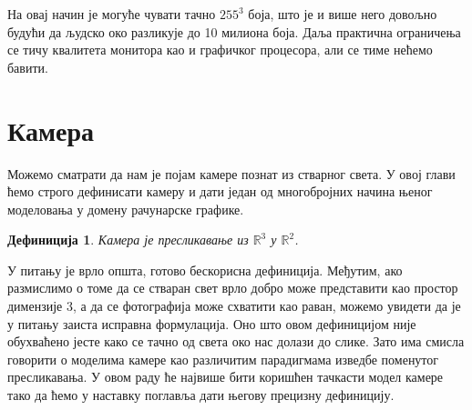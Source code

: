 \documentclass[12pt, a4paper, twoside]{book}
\numberwithin{equation}{chapter}
\numberwithin{theorem}{section}
\newtheorem{definition}{Дефиниција}
\numberwithin{definition}{section}
\numberwithin{definitionChapter}{chapter}
\begin{document}
На овај начин је могуће чувати тачно $255^3$ боја, што је и више него довољно будући да људско око разликује до 10
милиона боја. Даља практична ограничења се тичу квалитета монитора као и графичког процесора, али се тиме нећемо бавити.



\section{Камера}
Можемо сматрати да нам је појам камере познат из стварног света. У овој глави
ћемо строго дефинисати камеру и дати један од многобројних начина њеног
моделовања у домену рачунарске графике.

\begin{definition}
	Камера је пресликавање из $\mathbb{R}^3$ у $\mathbb{R}^2$.
\end{definition}

У питању је врло општа, готово бескорисна дефиниција. Међутим, ако размислимо
о томе да се стваран свет врло добро може представити као простор димензије $3$,
а да се фотографија може схватити као раван, можемо увидети да је у питању заиста
исправна формулација. Оно што овом дефиницијом није обухваћено јесте како се тачно
од света око нас долази до слике. Зато има смисла говорити о моделима камере као
различитим парадигмама изведбе поменутог пресликавања. У овом раду ће највише
бити коришћен тачкасти модел камере тако да ћемо у наставку поглавља дати његову
прецизну дефиницију.
	
\end{document}
